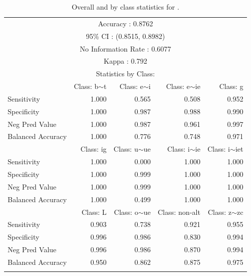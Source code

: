 \begin{table}
  \centering
  \begin{tabular}{lrrrr}
    \lsptoprule
    \multicolumn{5}{c}{Overall Statistics}           \\
    \midrule
    \multicolumn{5}{c}{Accuracy : 0.8762}            \\
    \multicolumn{5}{c}{95\% CI : (0.8515, 0.8982)}   \\
    \multicolumn{5}{c}{No Information Rate : 0.6077} \\
    \multicolumn{5}{c}{Kappa : 0.792}                \\
    \midrule
    \multicolumn{5}{c}{Statistics by Class:}         \\
    \midrule

 & Class: b$\sim$t & Class: e$\sim$i  & Class: e$\sim$ie    & Class: g     \\

    Sensitivity       & 1.000     & 0.565            & 0.508            & 0.952             \\
    Specificity       & 1.000     & 0.987            & 0.988            & 0.990             \\
    Neg Pred Value    & 1.000     & 0.987            & 0.961            & 0.997             \\
    Balanced Accuracy & 1.000     & 0.776            & 0.748            & 0.971             \\
                      & Class: ig & Class: u$\sim$ue & Class: i$\sim$ie & Class: i$\sim$iet \\
    Sensitivity       & 1.000     & 0.000            & 1.000            & 1.000             \\
    Specificity       & 1.000     & 0.999            & 1.000            & 1.000             \\
    Neg Pred Value    & 1.000     & 0.999            & 1.000            & 1.000             \\
    Balanced Accuracy & 1.000     & 0.499            & 1.000            & 1.000             \\

 & Class: L  & Class: o$\sim$ue & Class: non-alt   & Class: z$\sim$zc  \\

    Sensitivity       & 0.903     & 0.738            & 0.921            & 0.955             \\
    Specificity       & 0.996     & 0.986            & 0.830            & 0.994             \\
    Neg Pred Value    & 0.996     & 0.986            & 0.870            & 0.994             \\
    Balanced Accuracy & 0.950     & 0.862            & 0.875            & 0.975             \\
    \lspbottomrule
  \end{tabular}
  \caption{Overall and by class statistics for .}
  \label{tab:spanish-verbs-minor-v-stats}
\end{table}

